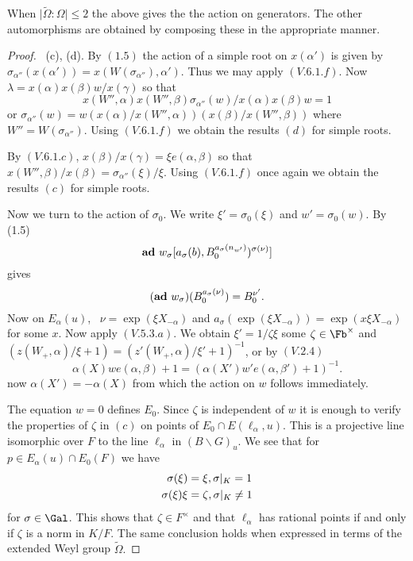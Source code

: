 \documentclass{memo-l}
\theoremstyle{definition}
\theoremstyle{remark}
\numberwithin{section}{chapter}
\numberwithin{equation}{chapter}
\begin{document}
\medskip

When $\vert\tilde\Omega:\Omega\vert\le2$ the above gives the the action
on generators.  The other automorphisms are obtained by composing these
in the appropriate manner.

\begin{proof} \ (c), (d).  By $(1.5)$ the action of a simple root on
$x({\alpha}')$ is given by ${\sigma}_{{\alpha}''}(x({\alpha}'))  = 
x(W({\sigma}_{{\alpha}''}),{\alpha}')$.  Thus we may apply $(V.6.1.f)$.  Now
${\lambda}  =  x({\alpha})x({\beta})w/x({\gamma})$ so that
$$
x(W'',{\alpha})x(W'',{\beta}){\sigma}_{{\alpha}''}(w)/x({\alpha})x({\beta})w  = 
1
$$
or ${\sigma}_{{\alpha}''}(w)  = 
w(x({\alpha})/x(W'',{\alpha}))(x({\beta})/x(W'',{\beta}))$ where $W''  = 
W({\sigma}_{{\alpha}''})$.  Using $(V.6.1.f)$ we obtain the results $(d)$
for simple roots.

   By $(V.6.1.c)$, $x({\beta})/x({\gamma})  =  {\xi}e({\alpha},{\beta})$ so
that $x(W'',{\beta})/x({\beta})  =  {\sigma}_{{\alpha}''}({\xi})/{\xi}$.  Using
$(V.6.1.f)$ once again we obtain the results $(c)$ for simple roots.

   Now we turn to the action of ${\sigma}_{0}$.  We write ${\xi}'  = 
{\sigma}_{0}({\xi})$ and $w'  =  {\sigma}_{0}(w)$.  By (1.5) 
$${\bold{ad}}\ w_{{\sigma}}[a_{{\sigma}}(b), B_{0}^{a_{{\sigma}}(n_{w'})})^{{\sigma}({\nu})}]$$
gives
$$
({\bold {ad}}\ w_{{\sigma}})(B_{0}^{a_{{\sigma}}({\nu})})  =  B_{0}^{\nu'}. 
$$
Now on $E_{{\alpha}}(u)$, \  $\nu  =  \exp({\xi}X_{-{\alpha}})$ and
$a_{{\sigma}}(\exp({\xi}X_{-{\alpha}}))  =  \exp(x{\xi}X_{-{\alpha}})$ for some
$x$.  Now apply $(V.5.3.a)$.  We obtain ${\xi}'  =  1/{\zeta}{\xi}$ some
${\zeta}  \in  \Fb^{\times}$ and $(z(W_{+},{\alpha})/{\xi} + 1)  = 
(z'(W_{+},{\alpha})/{\xi}' + 1)^{-1}$, or by $(V.2.4)$
$$
{\alpha}(X)we({\alpha},{\beta}) + 1  = 
({\alpha}(X')w'e({\alpha},{\beta}')+1)^{-1}.
$$
now ${\alpha}(X')  =  -{\alpha}(X)$ from which the action on $w$ follows
immediately.

   The equation $w = 0$ defines $E_{0}$.  Since ${\zeta}$ is independent of
$w$ it is enough to verify the properties of ${\zeta}$ in $(c)$ on points
of $E_{0}  \cap  E({\ell}_{{\alpha}},u)$.  This is a projective line
isomorphic over $F$ to the line ${\ell}_{{\alpha}}$ in $(B\backslash
G)_{u}$.  We see that for $p  \in  E_{{\alpha}}(u)  \cap  E_{0}(F)$ we have
$$
\aligned
{\sigma}({\xi})  &=  {\xi}, {\sigma}\vert _{K}  =  1 \\
{\sigma}({\xi}){\xi}  &=  {\zeta}, {\sigma}\vert _{K}  \ne 1
\endaligned
$$
for ${\sigma}  \in  \Gal$.  This shows that ${\zeta}  \in  F^{\times}$
and that ${\ell}_{{\alpha}}$ has rational points if and only if ${\zeta}$
is a norm in $K/F$.  The same conclusion holds when expressed in terms of
the extended Weyl group $\tilde{\Omega}.$
\end{proof} 
\end{document}
